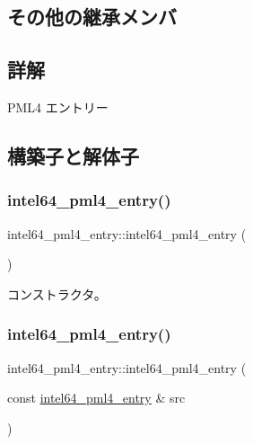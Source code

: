 \subsection*{その他の継承メンバ}


\subsection{詳解}
P\+M\+L4 エントリー 

\subsection{構築子と解体子}
\hypertarget{classintel64__pml4__entry_acf079a8708e3f1651af9cbd825691b75}{}\label{classintel64__pml4__entry_acf079a8708e3f1651af9cbd825691b75} 
\subsubsection{\texorpdfstring{intel64\+\_\+pml4\+\_\+entry()}{intel64\_pml4\_entry()}\hspace{0.1cm}{\footnotesize\ttfamily [1/3]}}
{\footnotesize\ttfamily intel64\+\_\+pml4\+\_\+entry\+::intel64\+\_\+pml4\+\_\+entry (\begin{DoxyParamCaption}{ }\end{DoxyParamCaption})}

コンストラクタ。 \hypertarget{classintel64__pml4__entry_aa6b703474769f6a50a5c0a650d7ab054}{}\label{classintel64__pml4__entry_aa6b703474769f6a50a5c0a650d7ab054} 
\subsubsection{\texorpdfstring{intel64\+\_\+pml4\+\_\+entry()}{intel64\_pml4\_entry()}\hspace{0.1cm}{\footnotesize\ttfamily [2/3]}}
{\footnotesize\ttfamily intel64\+\_\+pml4\+\_\+entry\+::intel64\+\_\+pml4\+\_\+entry (\begin{DoxyParamCaption}\item[{const \hyperlink{classintel64__pml4__entry}{intel64\+\_\+pml4\+\_\+entry} \&}]{src }\end{DoxyParamCaption})\hspace{0.3cm}{\ttfamily [delete]}}

